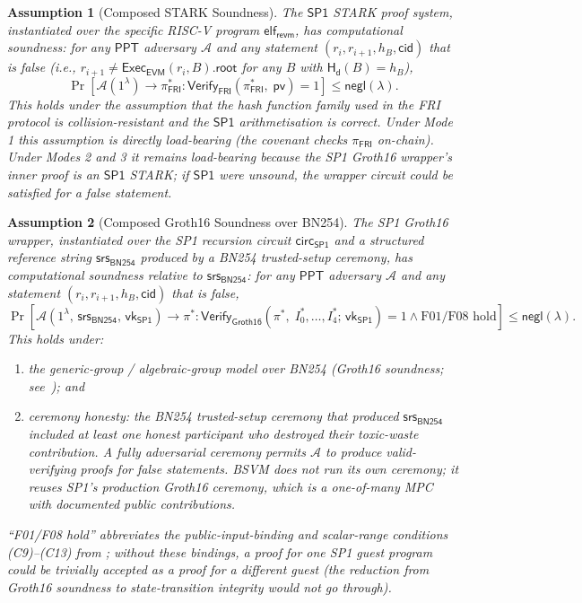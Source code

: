 \documentclass[11pt,a4paper]{article}
\newtheorem{assumption}{Assumption}[section]
\newcommand{\negl}{\mathsf{negl}}
\newcommand{\PPT}{\mathsf{PPT}}
\newcommand{\Adv}{\mathcal{A}}
\newcommand{\Hashd}{\mathsf{H_d}}        %
\newcommand{\Verify}{\mathsf{Verify}}
\newcommand{\Exec}{\mathsf{Exec}}
\newcommand{\FRI}{\mathsf{FRI}}
\newcommand{\Groth}{\mathsf{Groth16}}    %
\newcommand{\SPone}{\mathsf{SP1}}
\newcommand{\revm}{\textsf{revm}}
\newcommand{\EVM}{\mathsf{EVM}}
\newcommand{\SRS}{\mathsf{srs}_{\mathsf{BN254}}}  %
\newcommand{\vkSP}{\mathsf{vk}_{\SPone}}           %
\begin{document}
\begin{assumption}[Composed STARK Soundness]\label{ass:stark}
The $\SPone$ STARK proof system, instantiated over the specific RISC-V program $\mathsf{elf}_{\revm}$, has computational soundness: for any $\PPT$ adversary $\Adv$ and any statement $(r_i, r_{i+1}, h_B, \mathsf{cid})$ that is false (i.e., $r_{i+1} \neq \Exec_{\EVM}(r_i, B).\mathsf{root}$ for any $B$ with $\Hashd(B) = h_B$),
\[
    \Pr\!\left[\Adv(1^\lambda) \to \pi_{\FRI}^* : \Verify_{\FRI}(\pi_{\FRI}^*,\; \mathsf{pv}) = 1\right] \leq \negl(\lambda).
\]
This holds under the assumption that the hash function family used in the FRI protocol is collision-resistant and the $\SPone$ arithmetisation is correct. Under Mode 1 this assumption is directly load-bearing (the covenant checks $\pi_{\FRI}$ on-chain). Under Modes 2 and 3 it remains load-bearing because the SP1 Groth16 wrapper's inner proof is an $\SPone$ STARK; if $\SPone$ were unsound, the wrapper circuit could be satisfied for a false statement.
\end{assumption}

\begin{assumption}[Composed Groth16 Soundness over BN254]\label{ass:groth}
The SP1 Groth16 wrapper, instantiated over the SP1 recursion circuit $\mathsf{circ}_{\SPone}$ and a structured reference string $\SRS$ produced by a BN254 trusted-setup ceremony, has computational soundness relative to $\SRS$: for any $\PPT$ adversary $\Adv$ and any statement $(r_i, r_{i+1}, h_B, \mathsf{cid})$ that is false,
\[
    \Pr\!\left[\Adv(1^\lambda,\, \SRS,\, \vkSP) \to \pi^* : \Verify_{\Groth}(\pi^*,\; I_0^*, \ldots, I_4^*;\, \vkSP) = 1 \wedge \textrm{F01/F08 hold}\right] \leq \negl(\lambda).
\]
This holds under:
\begin{enumerate}[nosep,label=(\alph*)]
    \item the generic-group / algebraic-group model over BN254 (Groth16 soundness; see~\cite{groth2016}); and
    \item \emph{ceremony honesty}: the BN254 trusted-setup ceremony that produced $\SRS$ included at least one honest participant who destroyed their toxic-waste contribution. A fully adversarial ceremony permits $\Adv$ to produce valid-verifying proofs for false statements. BSVM does not run its own ceremony; it reuses SP1's production Groth16 ceremony, which is a one-of-many MPC with documented public contributions.
\end{enumerate}
``F01/F08 hold'' abbreviates the public-input-binding and scalar-range conditions (C9)--(C13) from ; without these bindings, a proof for one SP1 guest program could be trivially accepted as a proof for a different guest (the reduction from Groth16 soundness to state-transition integrity would not go through).
\end{assumption}
\end{document}
